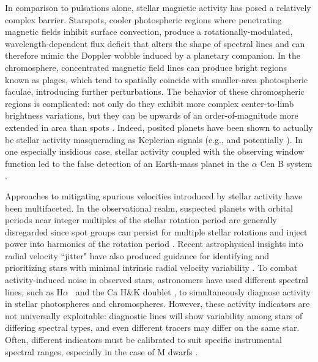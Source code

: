 \documentclass[twocolumn]{aastex63}
\newcommand{\Halpha}{H$\alpha$}
\newcommand{\revise}[1]{#1}
\begin{document}
In comparison to pulsations alone, stellar magnetic activity has posed a relatively complex barrier. Starspots, cooler photospheric regions where penetrating magnetic fields inhibit surface convection, produce a rotationally-modulated, wavelength-dependent flux deficit that alters the shape of spectral lines and can therefore mimic the Doppler wobble induced by a planetary companion. In the chromosphere, concentrated magnetic field lines can produce bright regions known as plages\revise{, which tend to spatially coincide with smaller-area photospheric faculae, introducing} further perturbations. The behavior of these chromospheric regions is complicated: not only do they exhibit more complex center-to-limb brightness variations, but they can be upwards of an order-of-magnitude more extended in area than spots \citep[e.g.,][]{Chapman2001, Meunier2010}. Indeed, posited planets have been shown to actually be stellar activity \revise{masquerading as Keplerian signals} (e.g., \citealt{Robertson2014} and potentially \citealt{Jeffers2014}). In one especially insidious case, stellar activity coupled with the observing window function led to the false detection of an Earth-mass planet in the $\alpha$ Cen B system \citep{Dumusque2012, Rajpaul2016}.  \par

Approaches to mitigating spurious velocities introduced by stellar activity have been multifaceted. In the observational realm, suspected planets with orbital periods near integer multiples of the stellar rotation period are generally disregarded since spot groups can persist for multiple stellar rotations and inject power into harmonics of the rotation period \citep{Robertson2014}. Recent astrophysical insights into radial velocity ``jitter" have also produced guidance for identifying and prioritizing stars with minimal intrinsic radial velocity variability \citep{Luhn2020}. To combat activity-induced noise in observed stars, astronomers have used different spectral lines, such as \Halpha\ \citep[e.g.,][]{Kurster2003, Hatzes2015} and the Ca H\&K doublet \citep[e.g.,][]{Wilson1968, Wright2004, Isaacson2010}, to simultaneously diagnose activity in stellar photospheres and chromospheres. However, these activity indicators are not universally exploitable: diagnostic lines will show variability among stars of differing spectral types, and even different tracers may differ on the same star. Often, different indicators must be calibrated to suit specific instrumental spectral ranges, especially in the case of M dwarfs \citep{Robertson2016}. \par
\end{document}
